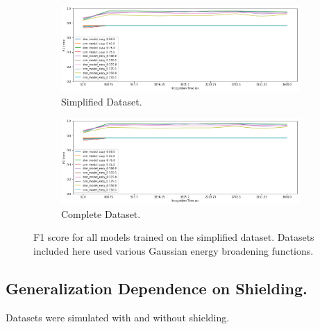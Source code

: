 \begin{figure}[H]
     \centering
     \begin{subfigure}[b]{0.9\textwidth}
         \centering
         \includegraphics[width=\textwidth]{images/results_easy_distance_comparison}
         \caption{Simplified Dataset.}
         \label{fig:results_easy_distance_comparison_simple}
     \end{subfigure}

     \begin{subfigure}[b]{0.9\textwidth}
         \centering
         \includegraphics[width=\textwidth]{images/results_easy_distance_comparison}
         \caption{Complete Dataset.}
         \label{fig:results_easy_distance_comparison_full}
     \end{subfigure}
        \caption{F1 score for all models trained on the simplified dataset. Datasets included here used various Gaussian energy broadening functions.}
        \label{fig:results_easy_distance_comparison}
\end{figure}


\subsection{Generalization Dependence on Shielding.}

Datasets were simulated with and without shielding. 

